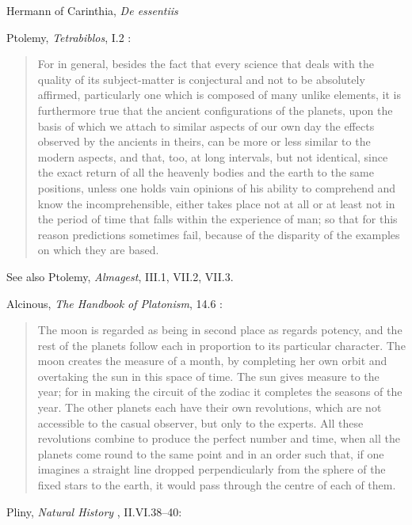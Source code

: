 \documentclass{amsart}
\theoremstyle{definition}
\begin{document}
Hermann of Carinthia, {\em De essentiis} \cite{essentiis}

Ptolemy, {\em Tetrabiblos}, I.2 \cite[pp.~15--17]{tetrabiblos}:

\begin{quote}
For in general, besides the fact that every science that deals with the quality of its subject-matter is conjectural and not to be absolutely affirmed, particularly one which is composed of many unlike elements, it is furthermore true that the ancient configurations of the planets, upon the basis of which we attach to similar aspects of our own day the effects observed by the ancients in theirs, can be more or less similar to the modern aspects, and that, too, at long intervals, but not identical, since the exact return of all the heavenly bodies and the earth to the same positions, unless one holds vain opinions of his ability to comprehend and know the incomprehensible, either takes place not at all or at least not in the period of time that falls within the experience of man; so that for this reason predictions sometimes fail, because of the disparity of the examples on which they are based.
\end{quote}

See also Ptolemy, {\em Almagest}, III.1, VII.2, VII.3.

Alcinous, {\em The Handbook of Platonism}, 14.6 \cite[pp.~24--25]{alcinous}:

\begin{quote}
The moon is regarded as being in second place as regards potency, and the rest of the planets follow each in proportion to its particular character. The moon creates the measure
of a month, by completing her own orbit and overtaking the sun in this space of time. The sun gives measure to the year; for in making the circuit of the zodiac it completes
the seasons of the year. The other planets each have their own revolutions, which are not accessible to the casual observer, but only to the experts. All these revolutions combine
to produce the perfect number and time, when all the planets come round to the same point and in an order such that, if one imagines a straight line dropped perpendicularly
from the sphere of the fixed stars to the earth, it would pass through the centre of each of them.
\end{quote}


Pliny, {\em Natural History} \cite[p.~193]{pliny}, II.VI.38--40: 
\end{document}
